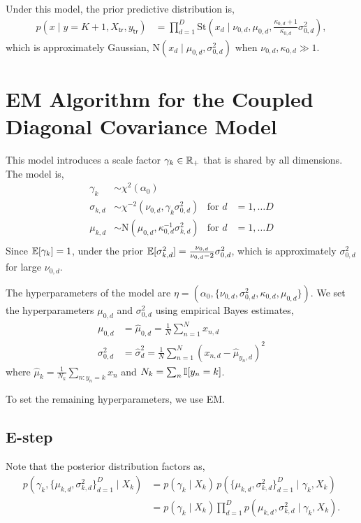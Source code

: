 Under this model, the prior predictive distribution is,
\begin{align*}
    p(x \mid y=K+1, X_{\mathsf{tr}}, y_{\mathsf{tr}})
    &= \prod_{d=1}^D \mathrm{St}(x_d \mid \nu_{0,d}, \mu_{0,d}, \tfrac{\kappa_{0,d} + 1}{\kappa_{0,d}} \sigma_{0,d}^2),
\end{align*}
which is approximately Gaussian, $\mathrm{N}(x_d \mid \mu_{0,d}, \sigma_{0,d}^2)$ when $\nu_{0,d}, \kappa_{0,d} \gg 1$.

\section{EM Algorithm for the Coupled Diagonal Covariance Model}
\label{app:em-coupled}
This model introduces a scale factor $\gamma_k \in \mathbb{R}_+$ that is shared by all dimensions. The model is,
\begin{align*}
    \gamma_k &\sim \chi^2(\alpha_0) \\
    \sigma_{k,d} &\sim \chi^{-2}(\nu_{0,d}, \gamma_k \sigma_{0,d}^2) & \text{for } d &=1,\ldots D  \\
    \mu_{k,d} &\sim \mathrm{N}(\mu_{0,d}, \kappa_{0,d}^{-1} \sigma_{k,d}^2) &  \text{for } d &=1,\ldots D  \\
\end{align*}
Since $\mathbb{E}[\gamma_k] = 1$, under the prior $\mathbb{E}[\sigma_{k,d}^2] = \tfrac{\nu_{0,d}}{\nu_{0,d}-2} \sigma_{0,d}^2$, which is approximately $\sigma_{0,d}^2$ for large $\nu_{0,d}$.

The hyperparameters of the model are $\eta = (\alpha_0, \{\nu_{0,d}, \sigma_{0,d}^2, \kappa_{0,d}, \mu_{0,d}\})$. We set the hyperparameters $\mu_{0,d}$ and $\sigma_{0,d}^2$ using empirical Bayes estimates,
\begin{align}
    \mu_{0,d} &= \hat{\mu}_{0,d} = \frac{1}{N} \sum_{n=1}^N x_{n,d} \\
    \sigma_{0,d}^2 &= \hat{\sigma}_{d}^2 = \frac{1}{N} \sum_{n=1}^N (x_{n,d} - \hat{\mu}_{y_n,d})^2
\end{align}
where $\hat{\mu}_{k} = \frac{1}{N_k} \sum_{n: y_n=k} x_n$ and $N_k = \sum_n \mathbb{I}[y_n = k]$.

To set the remaining hyperparameters, we use EM.

\subsection{E-step}
Note that the posterior distribution factors as,
\begin{align*}
    p(\gamma_k, \{\mu_{k,d}, \sigma_{k,d}^2\}_{d=1}^D \mid X_k)
    &= p(\gamma_k \mid X_k) \, p(\{\mu_{k,d}, \sigma_{k,d}^2\}_{d=1}^D \mid \gamma_k, X_k) \\
    &= p(\gamma_k \mid X_k) \prod_{d=1}^D p(\mu_{k,d}, \sigma_{k,d}^2 \mid \gamma_k, X_k).
\end{align*}

